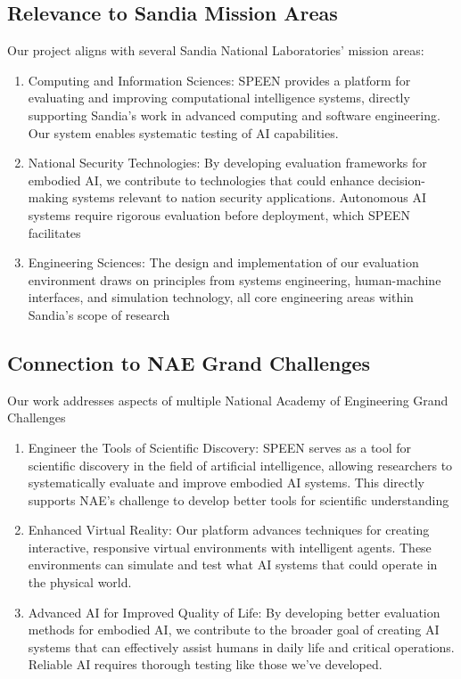 \documentclass{article}
\begin{document}
\subsection{Relevance to Sandia Mission Areas}
Our project aligns with several Sandia National Laboratories' mission areas:
\begin{enumerate}
    \item Computing and Information Sciences: SPEEN provides a platform for evaluating and improving computational intelligence systems, directly supporting Sandia's work in advanced computing and software engineering.
    Our system enables systematic testing of AI capabilities.
    \item National Security Technologies: By developing evaluation frameworks for embodied AI, we contribute to technologies that could enhance decision-making systems relevant to nation security applications.
    Autonomous AI systems require rigorous evaluation before deployment, which SPEEN facilitates
    \item Engineering Sciences: The design and implementation of our evaluation environment draws on principles from systems engineering, human-machine interfaces, and simulation technology, all core engineering areas within Sandia's scope of research
\end{enumerate}

\subsection{Connection to NAE Grand Challenges}
Our work addresses aspects of multiple National Academy of Engineering Grand Challenges
\begin{enumerate}
    \item Engineer the Tools of Scientific Discovery: SPEEN serves as a tool for scientific discovery in the field of artificial intelligence, allowing researchers to systematically evaluate and improve embodied AI systems.
    This directly supports NAE's challenge to develop better tools for scientific understanding
    \item Enhanced Virtual Reality: Our platform advances techniques for creating interactive, responsive virtual environments with intelligent agents.
    These environments can simulate and test what AI systems that could operate in the physical world.
    \item Advanced AI for Improved Quality of Life: By developing better evaluation methods for embodied AI, we contribute to the broader goal of creating AI systems that can effectively assist humans in daily life and critical operations.
    Reliable AI requires thorough testing like those we've developed.
\end{enumerate}
\end{document}
